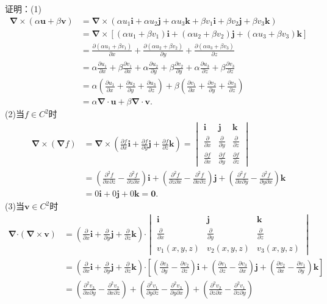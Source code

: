 \documentclass[12pt,UTF8]{ctexart}
\newcommand{\pp}[2]{\frac{\partial #1}{\partial #2}}
\begin{document}
\begin{enumerate}
证明：(1)\[\begin{split}
\bm\nabla\times(\alpha\bm u+\beta\bm v)&=\bm\nabla\times(\alpha u_1\bm i+\alpha u_2\bm j+\alpha u_3\bm k+\beta v_1\bm i+\beta v_2\bm j+\beta v_3\bm k)\\
&=\bm\nabla\times[(\alpha u_1+\beta v_1)\bm i+(\alpha u_2+\beta v_2)\bm j+(\alpha u_3+\beta v_3)\bm k]\\
&=\pp{(\alpha u_1+\beta v_1)}x+\pp{(\alpha u_2+\beta v_2)}y+\pp{(\alpha u_3+\beta v_3)}z\\
&=\alpha\pp{u_1}x+\beta\pp{v_1}x+\alpha\pp{u_2}y+\beta\pp{v_2}y+\alpha\pp{u_3}z+\beta\pp{v_3}z\\
&=\alpha(\pp{u_1}x+\pp{u_2}y+\pp{u_3}z)+\beta(\pp{v_1}x+\pp{v_2}y+\pp{v_3}z)\\
&=\alpha\bm\nabla\cdot\bm u+\beta\bm\nabla\cdot\bm v.
\end{split}\]
(2)当$f\in C^2$时
\[\begin{split}
\bm\nabla\times(\bm\nabla f)&=\bm\nabla\times(\pp fx\bm i+\pp fy\bm j+\pp fz\bm k)=\begin{vmatrix}
\bm i&\bm j&\bm k\\
\pp{}x&\pp{}y&\pp{}z\\
\pp fx&\pp fy&\pp fz
\end{vmatrix}\\
&=(\frac{\partial^2f}{\partial x\partial z}-\frac{\partial^2f}{\partial z\partial x})\bm i+(\frac{\partial^2f}{\partial z\partial x}-\frac{\partial^2f}{\partial x\partial z})\bm j+(\frac{\partial^2f}{\partial x\partial y}-\frac{\partial^2f}{\partial y\partial x})\bm k\\
&=0\bm i+0\bm j+0\bm k=\bm0.
\end{split}\]
(3)当$\bm v\in C^2$时
\[\begin{split}
\bm\nabla\bm\cdot(\bm\nabla\times\bm v)&=(\pp{}x\bm i+\pp{}y\bm j+\pp{}z\bm k)\bm\cdot\begin{vmatrix}
\bm i&\bm j&\bm k\\
\pp{}x&\pp{}y&\pp{}z\\
v_1(x,y,z)&v_2(x,y,z)&v_3(x,y,z)
\end{vmatrix}\\
&=(\pp{}x\bm i+\pp{}y\bm j+\pp{}z\bm k)\bm\cdot[(\pp{v_3}y-\pp{v_2}z)\bm i+(\pp{v_1}z-\pp{v_3}x)\bm j+(\pp{v_2}x-\pp{v_1}y)\bm k]\\
&=(\frac{\partial^2 v_3}{\partial x\partial y}-\frac{\partial^2 v_2}{\partial x\partial z})+(\frac{\partial^2 v_1}{\partial y\partial  z}-\frac{\partial^2 v_3}{\partial y\partial x})+(\frac{\partial^2 v_2}{\partial z\partial x}-\frac{\partial^2 v_1}{\partial z\partial y})\\

\end{split}\]
\end{enumerate}
\end{document}
